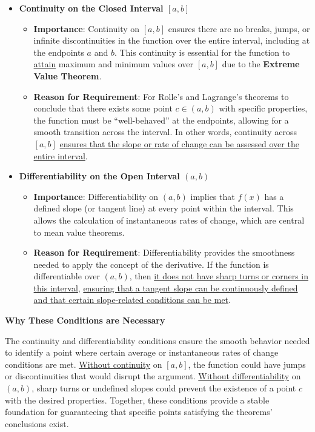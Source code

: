 \documentclass[a4paper,12pt]{book}
\begin{document}
\begin{itemize}[label=\textbullet]
\item
\textbf{Continuity on the Closed Interval \([a, b]\)}

	\begin{itemize}[label=\(\circ\), left=1.5em]
		\item 
		\textbf{Importance}: Continuity on \([a, b]\) ensures there are no breaks, jumps, or infinite discontinuities in the function over the entire interval, including at the endpoints \( a \) and \( b \). This continuity is essential for the function to \uline{attain} maximum and minimum values over \([a, b]\) due to the \textbf{Extreme Value Theorem}.
		\item 
		\textbf{Reason for Requirement}: For Rolle's and Lagrange’s theorems to conclude that there exists some point \( c \in (a, b) \) with specific properties, the function must be “well-behaved” at the endpoints, allowing for a smooth transition across the interval. In other words, continuity across \([a, b]\) \uline{ensures that the slope or rate of change can be assessed over the entire interval}.
	\end{itemize}
\item 
\textbf{Differentiability on the Open Interval \((a, b)\)}
	\begin{itemize}[label=\(\circ\), left=1.5em]
		\item 
		\textbf{Importance}: Differentiability on \((a, b)\) implies that \( f(x) \) has a defined slope (or tangent line) at every point within the interval. This allows the calculation of instantaneous rates of change, which are central to mean value theorems.
		\item
		\textbf{Reason for Requirement}: Differentiability provides the smoothness needed to apply the concept of the derivative. If the function is differentiable over \((a, b)\), then \uline{it does not have sharp turns or corners in this interval}, \uline{ensuring that a tangent slope can be continuously defined and that certain slope-related conditions can be met}.
	\end{itemize}
\end{itemize}

\textbf{Why These Conditions are Necessary}

The continuity and differentiability conditions ensure the smooth behavior needed to identify a point where certain average or instantaneous rates of change conditions are met. \uline{Without continuity} on \([a, b]\), the function could have jumps or discontinuities that would disrupt the argument. \uline{Without differentiability} on \((a, b)\), sharp turns or undefined slopes could prevent the existence of a point \( c \) with the desired properties. Together, these conditions provide a stable foundation for guaranteeing that specific points satisfying the theorems’ conclusions exist.
\end{document}
